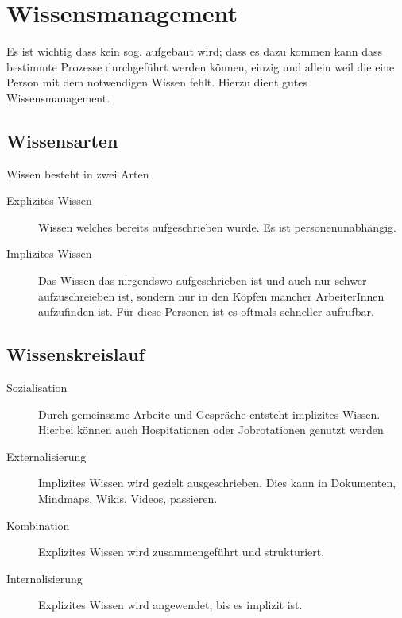 \documentclass{article}
\begin{document}
\section{Wissensmanagement} 
Es ist wichtig dass kein sog.  aufgebaut wird; dass es dazu kommen kann dass bestimmte Prozesse durchgeführt werden können, einzig und allein weil die eine Person mit dem notwendigen Wissen fehlt. Hierzu dient gutes Wissensmanagement.

\subsection{Wissensarten}
Wissen besteht in zwei Arten
\begin{description}
 \item[Explizites Wissen] Wissen welches bereits aufgeschrieben wurde. Es ist personenunabhängig.
 \item[Implizites Wissen] Das Wissen das nirgendswo aufgeschrieben ist und auch nur schwer aufzuschreieben ist, sondern nur in den Köpfen mancher ArbeiterInnen aufzufinden ist. Für diese Personen ist es oftmals schneller aufrufbar.
\end{description}

\subsection{Wissenskreislauf}
\begin{description}
 \item[Sozialisation] Durch gemeinsame Arbeite und Gespräche entsteht implizites Wissen. Hierbei können auch Hospitationen oder Jobrotationen genutzt werden
 \item[Externalisierung] Implizites Wissen wird gezielt ausgeschrieben. Dies kann in Dokumenten, Mindmaps, Wikis, Videos, \etc passieren.
 \item[Kombination] Explizites Wissen wird zusammengeführt und strukturiert.
 \item[Internalisierung] Explizites Wissen wird angewendet, bis es implizit ist.
\end{description}
\end{document}
